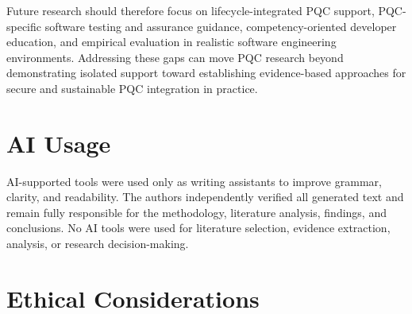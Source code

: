 \documentclass[letterpaper,twocolumn,10pt]{article}
\begin{document}
Future research should therefore focus on lifecycle-integrated PQC support, PQC-specific software testing and assurance guidance, competency-oriented developer education, and empirical evaluation in realistic software engineering environments. Addressing these gaps can move PQC research beyond demonstrating isolated support toward establishing evidence-based approaches for secure and sustainable PQC integration in practice.

\section*{AI Usage}
AI-supported tools were used only as writing assistants to improve grammar, clarity, and readability. The authors independently verified all generated text and remain fully responsible for the methodology, literature analysis, findings, and conclusions. No AI tools were used for literature selection, evidence extraction, analysis, or research decision-making.

\section*{Ethical Considerations}
\end{document}
